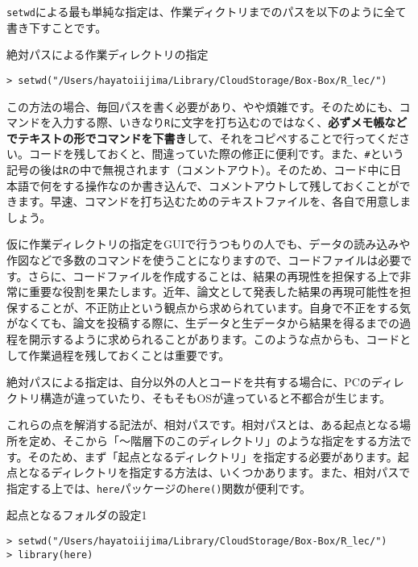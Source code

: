\texttt{setwd}による最も単純な指定は、作業ディクトリまでのパスを以下のように全て書き下すことです。

\begin{itembox}[l]{絶対パスによる作業ディレクトリの指定}
\begin{verbatim}
> setwd("/Users/hayatoiijima/Library/CloudStorage/Box-Box/R_lec/")
\end{verbatim}
\end{itembox}

この方法の場合、毎回パスを書く必要があり、やや煩雑です。そのためにも、コマンドを入力する際、いきなり\texttt{R}に文字を打ち込むのではなく、\textbf{必ずメモ帳などでテキストの形でコマンドを下書き}して、それをコピペすることで行ってください。コードを残しておくと、間違っていた際の修正に便利です。また、\verb|#|という記号の後は\texttt{R}の中で無視されます（コメントアウト）。そのため、コード中に日本語で何をする操作なのか書き込んで、コメントアウトして残しておくことができます。早速、コマンドを打ち込むためのテキストファイルを、各自で用意しましょう。

仮に作業ディレクトリの指定をGUIで行うつもりの人でも、データの読み込みや作図などで多数のコマンドを使うことになりますので、コードファイルは必要です。さらに、コードファイルを作成することは、結果の再現性を担保する上で非常に重要な役割を果たします。近年、論文として発表した結果の再現可能性を担保することが、不正防止という観点から求められています。自身で不正をする気がなくても、論文を投稿する際に、生データと生データから結果を得るまでの過程を開示するように求められることがあります。このような点からも、コードとして作業過程を残しておくことは重要です。

絶対パスによる指定は、自分以外の人とコードを共有する場合に、PCのディレクトリ構造が違っていたり、そもそもOSが違っていると不都合が生じます。

これらの点を解消する記法が、相対パスです。相対パスとは、ある起点となる場所を定め、そこから「〜階層下のこのディレクトリ」のような指定をする方法です。そのため、まず「起点となるディレクトリ」を指定する必要があります。起点となるディレクトリを指定する方法は、いくつかあります。また、相対パスで指定する上では、\texttt{here}パッケージの\texttt{here()}関数が便利です。

\begin{itembox}[l]{起点となるフォルダの設定1}
\begin{verbatim}
> setwd("/Users/hayatoiijima/Library/CloudStorage/Box-Box/R_lec/")
> library(here)
\end{verbatim}
\end{itembox}

